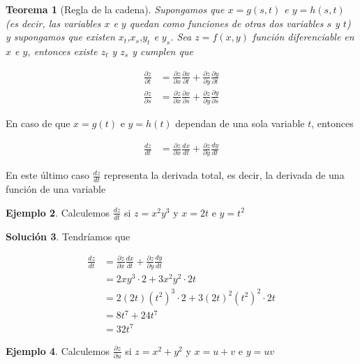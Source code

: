 \documentclass{article}
\theoremstyle{plain}
\newtheorem{thm}{Teorema}[section]
\theoremstyle{definition}
\newtheorem{ejem}[thm]{Ejemplo}
\newtheorem{sol}[thm]{Solución}
\begin{document}
\begin{thm}[Regla de la cadena]Supongamos que $x=g(s,t)$ e $y= h(s,t)$ (es decir, las variables $x$ e $y$ quedan como funciones de otras dos variables $s$ y $t$) y supongamos que existen $x_t$,$x_s$,$y_t$ e $y_s$. Sea $z =f(x,y) $ función diferenciable en $x$ e $y$, entonces existe $z_t$ y $z_s$ y cumplen que
\end{thm}

\begin{align*}
    \frac{\partial z}{\partial t} &= \frac{\partial z}{\partial x} \frac{\partial x}{\partial t} + \frac{\partial z}{\partial y} \frac{\partial y}{\partial t}  \\
    \frac{\partial z}{\partial s} &= \frac{\partial z}{\partial x} \frac{\partial x}{\partial s} + \frac{\partial z}{\partial y} \frac{\partial y}{\partial s}
\end{align*}

En caso de que $x=g(t)$ e $y= h(t)$ dependan de una sola variable $t$, entonces

\begin{align*}
    \frac{d z}{d t} &= \frac{\partial z}{\partial x} \frac{dx}{d t} + \frac{\partial z}{\partial y} \frac{dy}{d t}
\end{align*}

En este último caso $\displaystyle \frac{dz}{dt}$ representa la derivada total, es decir, la derivada de una función de una variable \\

\begin{ejem}Calculemos $\displaystyle \frac{dz}{dt}$ si $z=x^2y^3$ y $x=2t$ e $y=t^2$ \\
\end{ejem}

\begin{sol}Tendríamos que
\end{sol}

\begin{align*}
    \frac{d z}{d t} &= \frac{\partial z}{\partial x} \frac{dx}{d t} + \frac{\partial z}{\partial y} \frac{dy}{d t}  \\
    &= 2xy^3\cdot 2 + 3x^2y^2 \cdot 2t \\
    &= 2(2t)(t^2)^3\cdot 2 + 3(2t)^2(t^2)^2 \cdot 2t \\
    &= 8t^7 + 24t^7 \\
    &= 32t^7
\end{align*}

\begin{ejem}Calculemos $\displaystyle \frac{\partial z}{\partial u}$ si $z=x^2+y^2$ y $x=u+v$ e $y=uv$ \\
\end{ejem}
\end{document}
